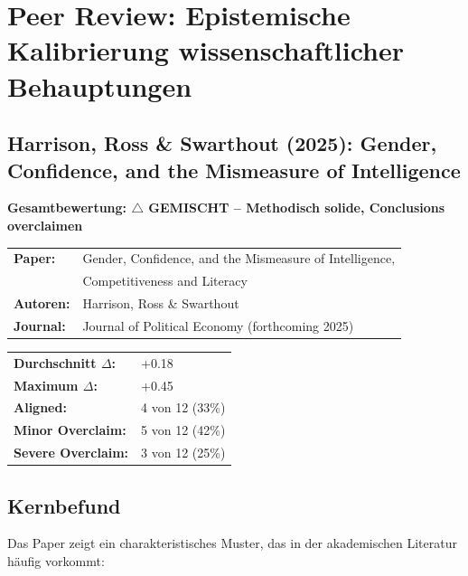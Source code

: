 
\section{Peer Review: Epistemische Kalibrierung wissenschaftlicher Behauptungen}
\label{app:peerreview}

\subsection*{Harrison, Ross \& Swarthout (2025): Gender, Confidence, and the Mismeasure of Intelligence}

\begin{tcolorbox}[colback=yellow!5!white,colframe=yellow!50!black,title=Executive Summary]
\textbf{Gesamtbewertung: $\triangle$ GEMISCHT -- Methodisch solide, Conclusions overclaimen}

\begin{tabular}{ll}
\textbf{Paper:} & Gender, Confidence, and the Mismeasure of Intelligence, \\
& Competitiveness and Literacy \\
\textbf{Autoren:} & Harrison, Ross \& Swarthout \\
\textbf{Journal:} & Journal of Political Economy (forthcoming 2025) \\
\end{tabular}

\vspace{0.5em}
\begin{tabular}{ll}
\textbf{Durchschnitt $\Delta$:} & +0.18 \\
\textbf{Maximum $\Delta$:} & +0.45 \\
\textbf{Aligned:} & 4 von 12 (33\%) \\
\textbf{Minor Overclaim:} & 5 von 12 (42\%) \\
\textbf{Severe Overclaim:} & 3 von 12 (25\%) \\
\end{tabular}
\end{tcolorbox}


\subsection{Kernbefund}

Das Paper zeigt ein charakteristisches Muster, das in der akademischen Literatur h\"aufig vorkommt:

